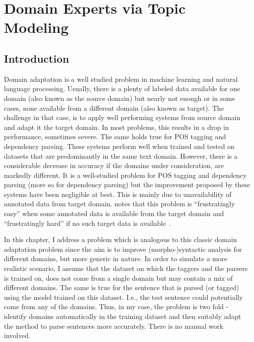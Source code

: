 \chapter{Domain Experts via Topic Modeling}


\section{Introduction}

Domain adaptation is a well studied problem in machine learning and natural language processing. Usually, there is a plenty of labeled data available for one domain (also known as the source domain) but nearly not enough or in some cases, none available from a different domain (also known as target). The challenge in that case, is to apply well performing systems from source domain and adapt it the target domain. In most problems, this results in a drop in performance, sometimes severe. The same holds true for POS tagging and dependency parsing. These systems perform well when trained and tested on datasets that are predominantly in the same text domain. However, there is a considerable decrease in accuracy if the domains under consideration, are markedly different. It is a well-studied problem for POS tagging and dependency parsing (more so for dependency parsing) but the improvement proposed by these systems have been negligible at best. This is mainly due to unavailability of annotated data from target domain. \cite{daume:07} notes that this problem is ``frustratingly easy'' when some annotated data  is available from the target domain  and ``frustratingly hard'' if no such target data is available~\citep{dredze:blitzer:ea:07}. 

In this chapter, I address a problem which is analogous to this classic domain adaptation problem since the aim is to improve (morpho-)syntactic analysis for different domains, but more generic in nature. In order to simulate a more realistic scenario, I assume that the  dataset on which the taggers and the parsers is trained on, does not come from a single domain but may contain a mix of different domains. The same is true for the sentence that is parsed (or tagged) using the model trained on this dataset. I.e., the test sentence could potentially come from any of the domains. Thus, in my case, the problem is two fold - identify domains automatically in the training dataset and then suitably adapt the method to parse sentences more accurately. There is no manual work involved. 

